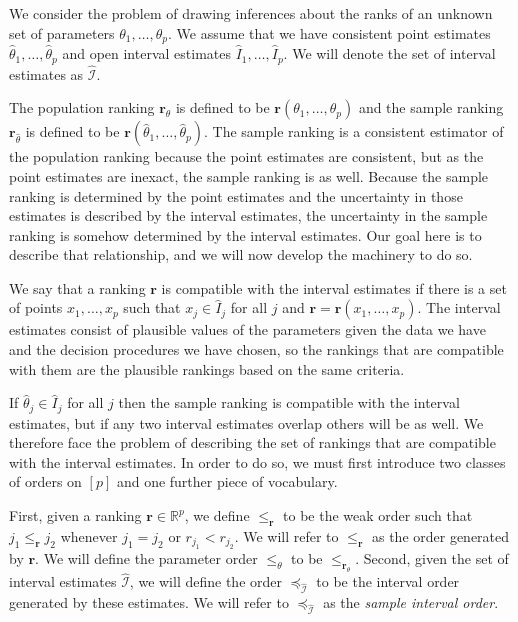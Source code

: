\documentclass[12pt]{article}
\newcommand{\iord}{{\preceq_{\hat{\mathcal{I}}}}}
\newcommand{\pord}{{\leqslant_{\theta}}}
\newcommand{\rord}[1][\mathbf{r}]{{\leqslant_{#1}}}
\newcommand{\rankp}{{\mathbf{r}_\theta}}
\newcommand{\ranks}{{\mathbf{r}_{\hat{\theta}}}}
\numberwithin{theorem}{section}
\begin{document}
We consider the problem of drawing inferences about the ranks of an unknown set of parameters $\theta_1, \dots, \theta_p$.  We assume that we have consistent point estimates $\hat{\theta}_1, \dots, \hat{\theta}_p$ and open interval estimates $\hat{I}_1, \dots, \hat{I}_p$.  We will denote the set of interval estimates as $\hat{\mathcal{I}}$.

The population ranking $\rankp$ is defined to be $\mathbf{r}(\theta_1, \dots, \theta_p)$ and the sample ranking $\ranks$ is defined to be $\mathbf{r}(\hat{\theta}_1, \dots, \hat{\theta}_p)$.  The sample ranking is a consistent estimator of the population ranking because the point estimates are consistent, but as the point estimates are inexact, the sample ranking is as well.  Because the sample ranking is determined by the point estimates and the uncertainty in those estimates is described by the interval estimates, the uncertainty in the sample ranking is somehow determined by the interval estimates.  Our goal here is to describe that relationship, and we will now develop the machinery to do so.

We say that a ranking $\mathbf{r}$ is compatible with the interval estimates if there is a set of points $x_1, \dots, x_p$ such that $x_j \in \hat{I}_j$ for all $j$ and $\mathbf{r} = \mathbf{r}(x_1, \dots, x_p)$.  The interval estimates consist of plausible values of the parameters given the data we have and the decision procedures we have chosen, so the rankings that are compatible with them are the plausible rankings based on the same criteria.

If $\hat{\theta}_j \in \hat{I}_j$ for all $j$ then the sample ranking is compatible with the interval estimates, but if any two interval estimates overlap others will be as well.  We therefore face the problem of describing the set of rankings that are compatible with the interval estimates.  In order to do so, we must first introduce two classes of orders on $[p]$ and one further piece of vocabulary.

First, given a ranking $\mathbf{r} \in \mathbb{R}^p$, we define $\rord$ to be the weak order such that $j_1 \rord j_2$ whenever $j_1 = j_2$ or $r_{j_1} < r_{j_2}$.  We will refer to $\rord$ as the order generated by $\mathbf{r}$.  We will define the parameter order $\pord$ to be $\rord[\rankp]$.  Second, given the set of interval estimates $\hat{\mathcal{I}}$, we will define the order $\iord$ to be the interval order generated by these estimates.  We will refer to $\iord$ as the \emph{sample interval order}.
\end{document}
